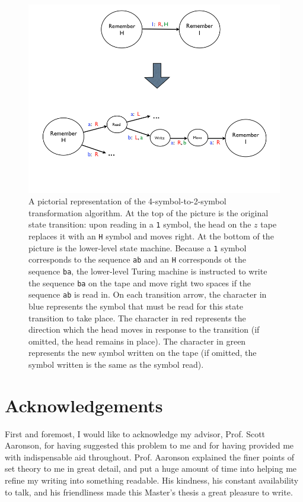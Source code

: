 \documentclass[11pt]{report}
\begin{document}
\begin{figure} 
\begin{center} 
\includegraphics[scale=0.4]{figs/goldbach6.png} 
\caption{A pictorial representation of the 4-symbol-to-2-symbol transformation algorithm. At the top of the picture is the original state transition: upon reading in a \texttt{1} symbol, the head on the $z$ tape replaces it with an \texttt{H} symbol and moves right. At the bottom of the picture is the lower-level state machine. Because a \texttt{1} symbol corresponds to the sequence \texttt{ab} and an \texttt{H} corresponds ot the sequence \texttt{ba}, the lower-level Turing machine is instructed to write the sequence \texttt{ba} on the tape and move right two spaces if the sequence \texttt{ab} is read in. On each transition arrow, the character in blue represents the symbol that must be read for this state transition to take place. The character in red represents the direction which the head moves in response to the transition (if omitted, the head remains in place). The character in green represents the new symbol written on the tape (if omitted, the symbol written is the same as the symbol read). \label{fig:goldbach6}}
\end{center} 
\end{figure}

\section{Acknowledgements}

First and foremost, I would like to acknowledge my advisor, Prof. Scott Aaronson, for having suggested this problem to me and for having provided me with indispensable aid throughout. Prof. Aaronson explained the finer points of set theory to me in great detail, and put a huge amount of time into helping me refine my writing into something readable. His kindness, his constant availability to talk, and his friendliness made this Master's thesis a great pleasure to write.
\end{document}
